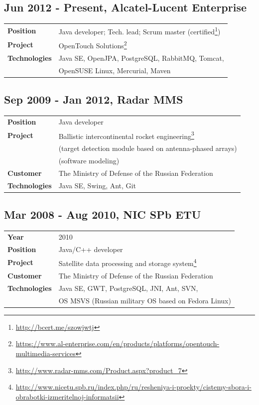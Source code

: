\documentclass[a4paper,12pt]{article}
\begin{document}
\subsection*{Jun 2012 - Present, Alcatel-Lucent Enterprise}

\begin{tabular}{ll}
    \textbf{Position} & Java developer; Tech. lead; Scrum master (certified\footnote{\url{http://bcert.me/szowjwtj}}) \\
    \textbf{Project} & OpenTouch Solutions\footnote{\url{https://www.al-enterprise.com/en/products/platforms/opentouch-multimedia-services}} \\
    \textbf{Technologies} & Java SE, OpenJPA, PostgreSQL, RabbitMQ, Tomcat, \\
        & OpenSUSE Linux, Mercurial, Maven \\
\end{tabular}

\subsection*{Sep 2009 - Jan 2012, Radar MMS}

\begin{tabular}{ll}
    \textbf{Position} & Java developer \\
    \textbf{Project} & Ballistic intercontinental rocket engineering\footnote{\url{http://www.radar-mms.com/Product.aspx?product_7}} \\
        & (target detection module based on antenna-phased arrays) \\
        & (software modeling) \\
    \textbf{Customer} & The Ministry of Defense of the Russian Federation \\
    \textbf{Technologies} & Java SE, Swing, Ant, Git \\
\end{tabular}

\subsection*{Mar 2008 - Aug 2010, NIC SPb ETU}

\begin{tabular}{ll}
    \textbf{Year} & 2010 \\
    \textbf{Position} & Java/C++ developer \\
    \textbf{Project} & Satellite data processing and storage system\footnote{\url{http://www.nicetu.spb.ru/index.php/ru/resheniya-i-proekty/cistemy-sbora-i-obrabotki-izmeritelnoj-informatsii}} \\
    \textbf{Customer} & The Ministry of Defense of the Russian Federation \\
    \textbf{Technologies} & Java SE, GWT, PostgreSQL, JNI, Ant, SVN, \\
        & OS MSVS (Russian military OS based on Fedora Linux) \\
\end{tabular}
\end{document}
